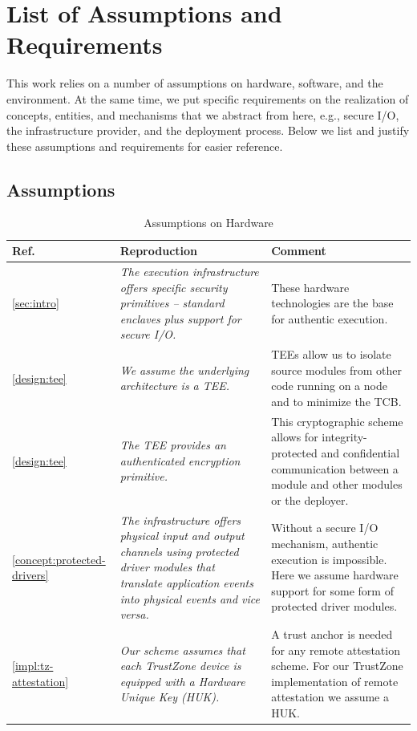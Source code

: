 \section{List of Assumptions and Requirements}
\label{app:assumptions}

This work relies on a number of assumptions on hardware, software, and the
environment. At the same time, we put specific requirements on the realization
of concepts, entities, and mechanisms that we abstract from here, e.g., secure
I/O, the infrastructure provider, and the deployment process. Below we list and
justify these assumptions and requirements for easier reference.

\clearpage

\subsection{Assumptions}
\label{app:asm}


\begin{longtable}{|p{}|p{}|p{}|}
\caption{Assumptions on Hardware}\\
\hline
Ref. & Reproduction & Comment \\
\hline
\hline

\ref{sec:intro} & 
\em The execution infrastructure offers specific security primitives -- standard enclaves plus support for secure I/O. &
These hardware technologies are the base for authentic execution. \\
\hline

\ref{design:tee} &
\em We assume the underlying architecture is a TEE. &
TEEs allow us to isolate source modules from other code running on a node and to minimize the TCB. \\
\hline

\ref{design:tee} &
\em The TEE provides an authenticated encryption primitive. &
This cryptographic scheme allows for integrity-protected and confidential communication between a module and other modules or the deployer. \\
\hline

\ref{concept:protected-drivers} &
\em The infrastructure offers physical input and output channels using protected driver modules that translate application events into physical events and vice versa. &
Without a secure I/O mechanism, authentic execution is impossible. Here we assume hardware support for some form of protected driver modules. \\
\hline

\ref{impl:tz-attestation} &
\em Our scheme assumes that each TrustZone device is equipped with a Hardware Unique Key (HUK). &
A trust anchor is needed for any remote attestation scheme. For our TrustZone implementation of remote attestation we assume a HUK.\\
\hline

\end{longtable}


